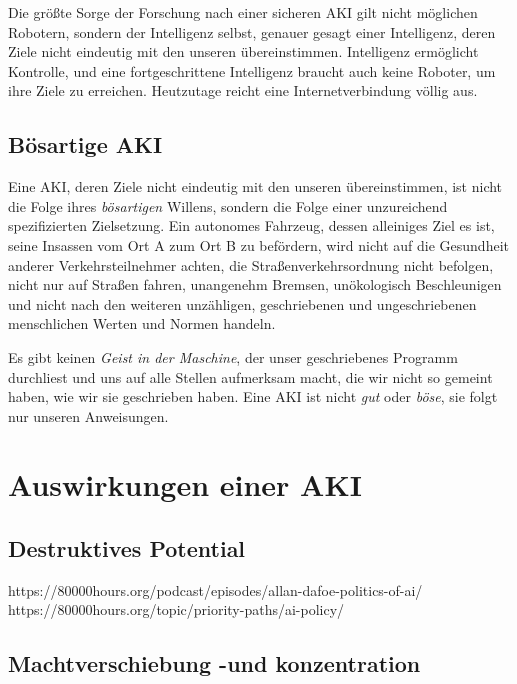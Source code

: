Die größte Sorge der Forschung nach einer sicheren AKI gilt nicht möglichen Robotern, sondern der Intelligenz selbst, genauer gesagt einer Intelligenz, deren Ziele nicht eindeutig mit den unseren übereinstimmen. Intelligenz ermöglicht Kontrolle, und eine fortgeschrittene Intelligenz braucht auch keine Roboter, um ihre Ziele zu erreichen. Heutzutage reicht eine Internetverbindung völlig aus. 
\subsection{Bösartige AKI}
Eine AKI, deren Ziele nicht eindeutig mit den unseren übereinstimmen, ist nicht die Folge ihres \emph{bösartigen} Willens, sondern die Folge einer unzureichend spezifizierten Zielsetzung. Ein autonomes Fahrzeug, dessen alleiniges Ziel es ist, seine Insassen vom Ort A zum Ort B zu befördern, wird nicht auf die Gesundheit anderer Verkehrsteilnehmer achten, die Straßenverkehrsordnung nicht befolgen, nicht nur auf Straßen fahren, unangenehm Bremsen, unökologisch Beschleunigen und nicht nach den weiteren unzähligen, geschriebenen und ungeschriebenen menschlichen Werten und Normen handeln.

Es gibt keinen \emph{Geist in der Maschine}, der unser geschriebenes Programm durchliest und uns auf alle Stellen aufmerksam macht, die wir nicht so gemeint haben, wie wir sie geschrieben haben. Eine AKI ist nicht \emph{gut} oder \emph{böse}, sie folgt nur unseren Anweisungen. 

\section{Auswirkungen einer AKI}
\subsection{Destruktives Potential}
https://80000hours.org/podcast/episodes/allan-dafoe-politics-of-ai/
https://80000hours.org/topic/priority-paths/ai-policy/
\subsection{Machtverschiebung -und konzentration}
